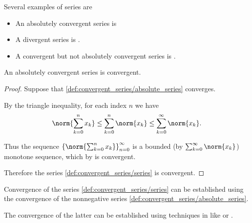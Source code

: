 \begin{example}\label{ex:series}
  Several examples of series are
  \begin{itemize}
    \item An absolutely convergent series is 
    \item A divergent series is .
    \item A convergent but not absolutely convergent series is .
  \end{itemize}
\end{example}

\begin{proposition}\label{thm:absolutely_convergent_series_is_convergent}
  An absolutely convergent series is convergent.
\end{proposition}
\begin{proof}
  Suppose that \eqref{def:convergent_series/absolute_series} converges.

  By the triangle inequality, for each index \( n \) we have
  \begin{equation*}
    \norm{\sum_{k=0}^n x_k} \leq \sum_{k=0}^n \norm{x_k} \leq \sum_{k=0}^\infty \norm{x_k}.
  \end{equation*}

  Thus the sequence \( \left\{ \norm{\sum_{k=0}^{n} x_k} \right\}_{n=0}^\infty \) is a bounded (by \( \sum_{k=0}^\infty \norm{x_k} \)) monotone sequence, which by  is convergent.

  Therefore the series \eqref{def:convergent_series/series} is convergent.
\end{proof}

\begin{remark}\label{rem:establish_series_convergence_by_absolute_series}
  Convergence of the series \eqref{def:convergent_series/series} can be established using the convergence of the nonnegative series \eqref{def:convergent_series/absolute_series}.

  The convergence of the latter can be established using techniques in  like  or .
\end{remark}

